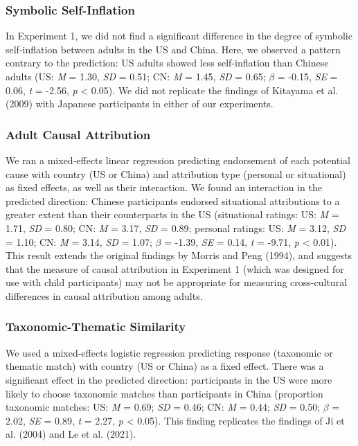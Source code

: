 \documentclass[
  man,floatsintext]{apa6}
\begin{document}
\hypertarget{symbolic-self-inflation-3}{%
\subsubsection{Symbolic Self-Inflation}\label{symbolic-self-inflation-3}}

In Experiment 1, we did not find a significant difference in the degree of symbolic self-inflation between adults in the US and China. Here, we observed a pattern contrary to the prediction: US adults showed less self-inflation than Chinese adults (US: \emph{M} = 1.30, \emph{SD} = 0.51; CN: \emph{M} = 1.45, \emph{SD} = 0.65; \(\beta\) = -0.15, \emph{SE} = 0.06, \emph{t} = -2.56, \emph{p} \textless{} 0.05). We did not replicate the findings of Kitayama et al. (2009) with Japanese participants in either of our experiments.

\hypertarget{adult-causal-attribution-1}{%
\subsubsection{Adult Causal Attribution}\label{adult-causal-attribution-1}}

We ran a mixed-effects linear regression predicting endorsement of each potential cause with country (US or China) and attribution type (personal or situational) as fixed effects, as well as their interaction. We found an interaction in the predicted direction: Chinese participants endorsed situational attributions to a greater extent than their counterparts in the US (situational ratings: US: \emph{M} = 1.71, \emph{SD} = 0.80; CN: \emph{M} = 3.17, \emph{SD} = 0.89; personal ratings: US: \emph{M} = 3.12, \emph{SD} = 1.10; CN: \emph{M} = 3.14, \emph{SD} = 1.07; \(\beta\) = -1.39, \emph{SE} = 0.14, \emph{t} = -9.71, \emph{p} \textless{} 0.01). This result extends the original findings by Morris and Peng (1994), and suggests that the measure of causal attribution in Experiment 1 (which was designed for use with child participants) may not be appropriate for measuring cross-cultural differences in causal attribution among adults.

\hypertarget{taxonomic-thematic-similarity-1}{%
\subsubsection{Taxonomic-Thematic Similarity}\label{taxonomic-thematic-similarity-1}}

We used a mixed-effects logistic regression predicting response (taxonomic or thematic match) with country (US or China) as a fixed effect. There was a significant effect in the predicted direction: participants in the US were more likely to choose taxonomic matches than participants in China (proportion taxonomic matches: US: \emph{M} = 0.69; \emph{SD} = 0.46; CN: \emph{M} = 0.44; \emph{SD} = 0.50; \(\beta\) = 2.02, \emph{SE} = 0.89, \emph{t} = 2.27, \emph{p} \textless{} 0.05). This finding replicates the findings of Ji et al. (2004) and Le et al. (2021).
\end{document}
